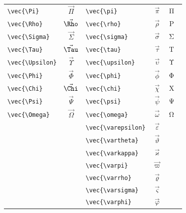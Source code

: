 \documentclass[12pt,a4paper]{article}
\begin{document}
\begin{longtable}{|l|c|l|c|c|}
\verb|\vec{\Pi}|         & $\vec{\Pi}$      & \verb|\vec{\pi}|         & $\vec{\pi}$         & Π⃗ π⃗ \\
\verb|\vec{\Rho}|        & $\vec{\Rho}$     & \verb|\vec{\rho}|        & $\vec{\rho}$        & Ρ⃗ ρ⃗ \\
\verb|\vec{\Sigma}|      & $\vec{\Sigma}$   & \verb|\vec{\sigma}|      & $\vec{\sigma}$      & Σ⃗ σ⃗ \\
\verb|\vec{\Tau}|        & $\vec{\Tau}$     & \verb|\vec{\tau}|        & $\vec{\tau}$        & Τ⃗ τ⃗ \\
\verb|\vec{\Upsilon}|    & $\vec{\Upsilon}$ & \verb|\vec{\upsilon}|    & $\vec{\upsilon}$    & Υ⃗ υ⃗ \\
\verb|\vec{\Phi}|        & $\vec{\Phi}$     & \verb|\vec{\phi}|        & $\vec{\phi}$        & Φ⃗ φ⃗ \\
\verb|\vec{\Chi}|        & $\vec{\Chi}$     & \verb|\vec{\chi}|        & $\vec{\chi}$        & Χ⃗ χ⃗ \\
\verb|\vec{\Psi}|        & $\vec{\Psi}$     & \verb|\vec{\psi}|        & $\vec{\psi}$        & Ψ⃗ ψ⃗ \\
\verb|\vec{\Omega}|      & $\vec{\Omega}$   & \verb|\vec{\omega}|      & $\vec{\omega}$      & Ω⃗ ω⃗ \\
                         &                  & \verb|\vec{\varepsilon}| & $\vec{\varepsilon}$ & ε⃗ \\
                         &                  & \verb|\vec{\vartheta}|   & $\vec{\vartheta}$   & ϑ⃗ \\
                         &                  & \verb|\vec{\varkappa}|   & $\vec{\varkappa}$   & ϰ⃗ \\
                         &                  & \verb|\vec{\varpi}|      & $\vec{\varpi}$      & ϖ⃗ \\
                         &                  & \verb|\vec{\varrho}|     & $\vec{\varrho}$     & ϱ⃗ \\
                         &                  & \verb|\vec{\varsigma}|   & $\vec{\varsigma}$   & ς⃗ \\
                         &                  & \verb|\vec{\varphi}|     & $\vec{\varphi}$     & ϕ⃗ \\
\hline
\end{longtable}
\end{document}

